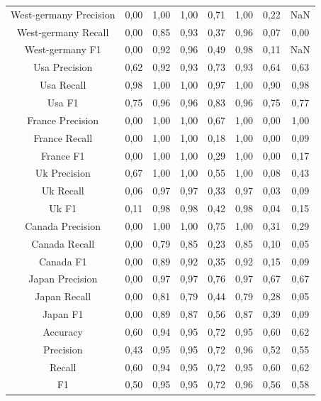 \documentclass{classrep}
\begin{document}
\begin{table}[h!]
\begin{tabular}{c c c c c c c c}
\hline
West-germany Precision 		& 0,00 & 1,00 & 1,00 & 0,71 & 1,00 & 0,22 & NaN\\
West-germany Recall 		& 0,00 & 0,85 & 0,93 & 0,37 & 0,96 & 0,07 & 0,00\\
West-germany F1			& 0,00 & 0,92 & 0,96 & 0,49 & 0,98 & 0,11 & NaN\\
\hline
Usa Precision 			& 0,62 & 0,92 & 0,93 & 0,73 & 0,93 & 0,64 & 0,63 \\
Usa Recall				& 0,98 & 1,00 & 1,00 & 0,97 & 1,00 & 0,90 & 0,98\\
Usa F1			 	& 0,75 & 0,96 & 0,96 & 0,83 & 0,96 & 0,75 & 0,77\\
\hline
France Precision 			& 0,00 & 1,00 & 1,00 & 0,67 & 1,00 & 0,00 & 1,00\\
France Recall 			& 0,00 & 1,00 & 1,00 & 0,18 & 1,00 & 0,00 & 0,09\\
France F1 				& 0,00 & 1,00 & 1,00 & 0,29 & 1,00 & 0,00 & 0,17\\
\hline
Uk Precision 				& 0,67 & 1,00 & 1,00 & 0,55 & 1,00 & 0,08 & 0,43\\
Uk Recall 				& 0,06 & 0,97 & 0,97 & 0,33 & 0,97 & 0,03 & 0,09\\
Uk F1 					& 0,11 & 0,98 & 0,98 & 0,42 & 0,98 & 0,04 & 0,15\\
\hline
Canada Precision			& 0,00 & 1,00 & 1,00 & 0,75 & 1,00 & 0,31 & 0,29\\
Canada Recall 			& 0,00 & 0,79 & 0,85 & 0,23 & 0,85 & 0,10 & 0,05\\
Canada F1 				& 0,00 & 0,89 & 0,92 & 0,35 & 0,92 & 0,15 & 0,09\\
\hline
Japan Precision 			& 0,00 & 0,97 & 0,97 & 0,76 & 0,97 & 0,67 & 0,67\\
Japan Recall 				& 0,00 & 0,81 & 0,79 & 0,44 & 0,79 & 0,28 & 0,05\\
Japan F1 				& 0,00 & 0,89 & 0,87 & 0,56 & 0,87 & 0,39 & 0,09\\
\hline
Accuracy 				& 0,60 & 0,94 & 0,95 & 0,72 & 0,95 & 0,60 & 0,62\\
Precision 				& 0,43 & 0,95 & 0,95 & 0,72 & 0,96 & 0,52 & 0,55\\
Recall 					& 0,60 & 0,94 & 0,95 & 0,72 & 0,95 & 0,60 & 0,62\\
F1 					& 0,50 & 0,95 & 0,95 & 0,72 & 0,96 & 0,56 & 0,58\\

\end {tabular}
\label {t3}
\end{table}
\end{document}
